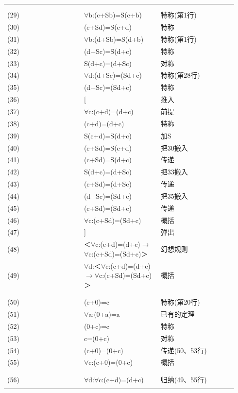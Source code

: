 \documentclass[
  12pt,
  twoside,
  openright,
  oldfontcommands,
]{memoir}
\begin{document}
\begin{longtable}[]{>{\raggedright\arraybackslash}p{0.313\linewidth} >{\raggedright\arraybackslash}p{0.313\linewidth} >{\raggedright\arraybackslash}p{0.313\linewidth}}
\multicolumn{3}{@{}l@{}}{%
〔S能够在一个加法里面前后滑来滑去。〕} \\
\multicolumn{3}{@{}l@{}}{%
*　*　*　*　*} \\
(29) & $\forall$b:(c+Sb)=S(c+b) & 特称(第1行) \\
(30) & (c+Sd)=S(c+d) & 特称 \\
(31) & $\forall$b:(d+Sb)=S(d+b) & 特称(第1行) \\
(32) & (d+Sc)=S(d+c) & 特称 \\
(33) & S(d+c)=(d+Sc) & 对称 \\
(34) & $\forall$d:(d+Sc)=(Sd+c) & 特称(第28行) \\
(35) & (d+Sc)=(Sd+c) & 特称 \\
(36) & {[} & 推入 \\
(37) & $\forall$c:(c+d)=(d+c) & 前提 \\
(38) & (c+d)=(d+c) & 特称 \\
(39) & S(c+d)=S(d+c) & 加S \\
(40) & (c+Sd)=S(c+d) & 把30搬入 \\
(41) & (c+Sd)=S(d+c) & 传递 \\
(42) & S(d+c)=(d+Sc) & 把33搬入 \\
(43) & (c+Sd)=(d+Sc) & 传递 \\
(44) & (d+Sc)=(Sd+c) & 把35搬入 \\
(45) & (c+Sd)=(Sd+c) & 传递 \\
(46) & $\forall$c:(c+Sd)=(Sd+c) & 概括 \\
(47) & {]} & 弹出 \\
(48) & ＜$\forall$c:(c+d)=(d+c)$\rightarrow$$\forall$c:(c+Sd)=(Sd+c)＞ & 幻想规则 \\
(49) & $\forall$d:＜$\forall$c:(c+d)=(d+c)$\rightarrow$$\forall$c:(c+Sd)=(Sd+c)＞ & 概括 \\
\multicolumn{3}{@{}l@{}}{%
〔如果d与每个c可交换，那么Sd也能这样做〕} \\
\multicolumn{3}{@{}l@{}}{%
*　*　*　*　*} \\
(50) & (c+0)=c & 特称(第20行) \\
(51) & $\forall$a:(0+a)=a & 已有的定理 \\
(52) & (0+c)=c & 特称 \\
(53) & c=(0+c) & 对称 \\
(54) & (c+0)=(0+c) & 传递(50、53行) \\
(55) & $\forall$c:(c+0)=(0+c) & 概括 \\
\multicolumn{3}{@{}l@{}}{%
〔0与每一个c可交换。〕} \\
\multicolumn{3}{@{}l@{}}{%
*　*　*　*　*} \\
(56) & $\forall$d:$\forall$c:(c+d)=(d+c) & 归纳(49、55行) \\
\multicolumn{3}{@{}l@{}}{%
〔因此，每一个d与每一个c可交换。〕} \\
\end{longtable}
\end{document}
